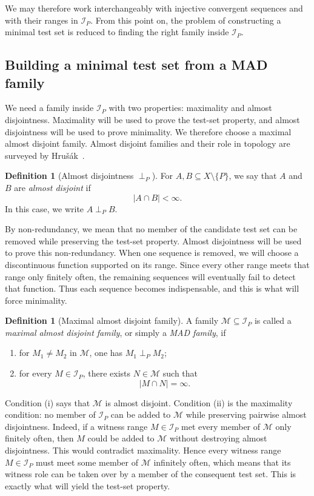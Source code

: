 \documentclass[11pt]{amsart}
\theoremstyle{plain}
\theoremstyle{definition}
\newtheorem{definition}[theorem]{Definition}
\theoremstyle{remark}
\begin{document}
We may therefore work interchangeably with injective convergent sequences and with their ranges in $\mathcal I_P$.
From this point on, the problem of constructing a minimal test set is reduced to finding the right family inside $\mathcal I_P$.

\subsection{Building a minimal test set from a MAD family}

We need a family inside $\mathcal I_P$ with two properties: maximality and almost disjointness.
Maximality will be used to prove the test-set property, and almost disjointness will be used to prove minimality.
We therefore choose a maximal almost disjoint family.
Almost disjoint families and their role in topology are surveyed by Hru\v{s}\'{a}k~\cite{Hru14}.

\begin{definition}[Almost disjointness $\perp_P$]\label{def:perpP}
For $A,B\subseteq X\setminus\{P\}$, we say that $A$ and $B$ are \emph{almost disjoint} if
\[
|A\cap B|<\infty.
\]
In this case, we write $A\perp_P B$.
\end{definition}

By non-redundancy, we mean that no member of the candidate test set can be removed while preserving the test-set property.
Almost disjointness will be used to prove this non-redundancy.
When one sequence is removed, we will choose a discontinuous function supported on its range.
Since every other range meets that range only finitely often, the remaining sequences will eventually fail to detect that function.
Thus each sequence becomes indispensable, and this is what will force minimality.

\begin{definition}[Maximal almost disjoint family]\label{def:MAD}
A family $\mathcal M\subseteq\mathcal I_P$ is called a \emph{maximal almost disjoint family}, or simply a \emph{MAD family}, if
\begin{enumerate}[label=(\roman*)]
\item for $M_1\neq M_2$ in $\mathcal M$, one has $M_1\perp_P M_2$;
\item for every $M\in\mathcal I_P$, there exists $N\in\mathcal M$ such that
\[
|M\cap N|=\infty.
\]
\end{enumerate}
\end{definition}

Condition (i) says that $\mathcal M$ is almost disjoint.
Condition (ii) is the maximality condition: no member of $\mathcal I_P$ can be added to $\mathcal M$ while preserving pairwise almost disjointness.
Indeed, if a witness range $M\in\mathcal I_P$ met every member of $\mathcal M$ only finitely often, then $M$ could be added to $\mathcal M$ without destroying almost disjointness.
This would contradict maximality.
Hence every witness range $M\in\mathcal I_P$ must meet some member of $\mathcal M$ infinitely often, which means that its witness role can be taken over by a member of the consequent test set.
This is exactly what will yield the test-set property.
\end{document}
